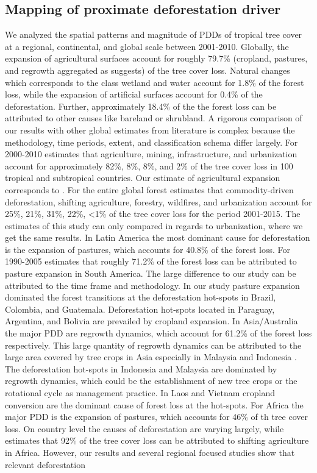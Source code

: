 		\subsection{Mapping of proximate deforestation driver}
		\label{subsec:discussion_proxy_deforestation_driver}
			We analyzed the spatial patterns and magnitude of \acp{PDD} of tropical tree cover at a regional, continental, and global scale between 2001-2010. Globally, the expansion of agricultural surfaces account for roughly 79.7\% (cropland, pastures, and regrowth aggregated as \citet{Geist2001} suggests) of the tree cover loss. Natural changes which corresponds to the class wetland and water account for 1.8\% of the forest loss, while the expansion of artificial surfaces account for 0.4\% of the deforestation. Further, approximately 18.4\% of the the forest loss can be attributed to other causes like bareland or shrubland. A rigorous comparison of our results with other global estimates from literature is complex because the methodology, time periods, extent, and classification schema differ largely. For 2000-2010 \citet{Hosonuma2012} estimates that agriculture, mining, infrastructure, and urbanization account for approximately 82\%, 8\%, 8\%, and 2\% of the tree cover loss in 100 tropical and subtropical countries. Our estimate of agricultural expansion corresponds to \citeauthor{Hosonuma2012}. For the entire global forest \citet{Curtis2018} estimates that commodity-driven deforestation, shifting agriculture, forestry, wildfires, and urbanization account for 25\%, 21\%, 31\%, 22\%, <1\% of the tree cover loss for the period 2001-2015. The estimates of this study can only compared in regards to urbanization, where we get the same results. In Latin America the most dominant cause for deforestation is the expansion of pastures, which accounts for 40.8\% of the forest loss. For 1990-2005 \citet{Sy2015} estimates that roughly 71.2\% of the forest loss can be attributed to pasture expansion in South America. The large difference to our study can be attributed to the time frame and methodology. In our study pasture expansion dominated the forest transitions at the deforestation hot-spots in Brazil, Colombia, and Guatemala. Deforestation hot-spots located in Paraguay, Argentina, and Bolivia are prevailed by cropland expansion. In Asia/Australia the major \ac{PDD} are regrowth dynamics, which account for 61.2\% of the forest loss respectively. This large quantity of regrowth dynamics can be attributed to the large area covered by tree crops in Asia especially in Malaysia and Indonesia \citep{Corley2016,Austin2019}. The deforestation hot-spots in Indonesia and Malaysia are dominated by regrowth dynamics, which could be the establishment of new tree crops or the rotational cycle as management practice. In Laos and Vietnam cropland conversion are the dominant cause of forest loss at the hot-spots. For Africa the major \ac{PDD} is the expansion of pastures, which accounts for 46\% of th tree cover loss. On country level the causes of deforestation are varying largely, while \citet{Curtis2018} estimates that 92\% of the tree cover loss can be attributed to shifting agriculture in Africa. However, our results and several regional focused studies show that relevant deforestation 